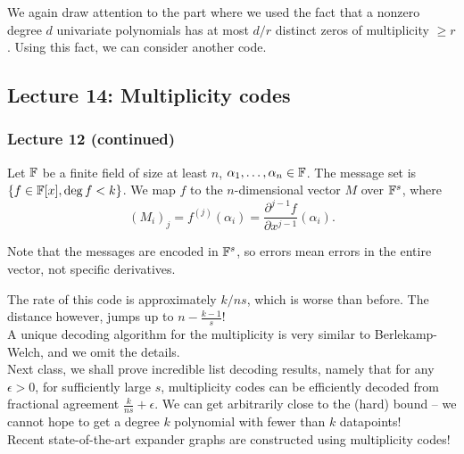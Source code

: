 		We again draw attention to the part where we used the fact that a nonzero degree $d$ univariate polynomials has at most $d/r$ distinct zeros of multiplicity $\ge r$.
		Using this fact, we can consider another code.

\subsection{Lecture 14: Multiplicity codes}

	\subsubsection{Lecture 12 (continued)}

		\begin{fdef}
			Let $\mathbb{F}$ be a finite field of size at least $n$, $\alpha_1,\ldots,\alpha_n \in \mathbb{F}$. The message set is $\{f \in \mathbb{F}[x], \deg f < k\}$. We map $f$ to the $n$-dimensional vector $M$ over $\mathbb{F}^s$, where
			\[ (M_{i})_j = f^{(j)}(\alpha_i) = \frac{\partial^{j-1} f}{\partial x^{j-1}}(\alpha_i). \]
		\end{fdef}
		Note that the messages are encoded in $\mathbb{F}^s$, so errors mean errors in the entire vector, not specific derivatives.

		The rate of this code is approximately $k/ns$, which is worse than before. The distance however, jumps up to $n - \frac{k-1}{s}$!\\
		A unique decoding algorithm for the multiplicity is very similar to Berlekamp-Welch, and we omit the details.\\
		Next class, we shall prove incredible list decoding results, namely that for any $\epsilon > 0$, for sufficiently large $s$, multiplicity codes can be efficiently decoded from fractional agreement $\frac{k}{ns} + \epsilon$. We can get arbitrarily close to the (hard) bound -- we cannot hope to get a degree $k$ polynomial with fewer than $k$ datapoints!\\ %
		Recent state-of-the-art expander graphs are constructed using multiplicity codes! %
	
